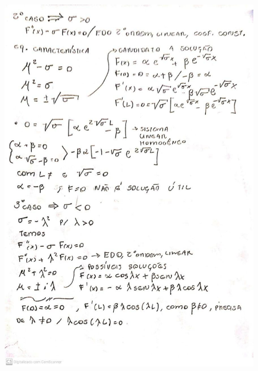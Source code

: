 \documentclass[a4paper]{article}
\begin{document}
        \begin{figure}{\textwidth}
            \centering
            \includegraphics[width=\textwidth]{22.jpg}
        \end{figure}
\end{document}
